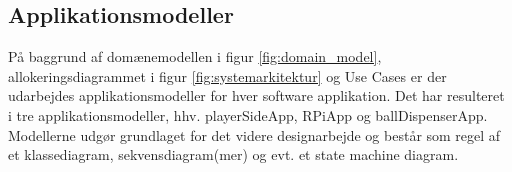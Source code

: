 \documentclass[Arkitektur/System_main.tex]{subfiles}
\begin{document}
\subsection{Applikationsmodeller} \label{sec:application_models}

På baggrund af domænemodellen i figur \ref{fig:domain_model}, allokeringsdiagrammet i figur \ref{fig:systemarkitektur} og Use Cases er der udarbejdes applikationsmodeller for hver software applikation. Det har resulteret i tre applikationsmodeller, hhv. playerSideApp, RPiApp og ballDispenserApp. Modellerne udgør grundlaget for det videre designarbejde og består som regel af et klassediagram, sekvensdiagram(mer) og evt. et state machine diagram.


\newpage


\end{document}
